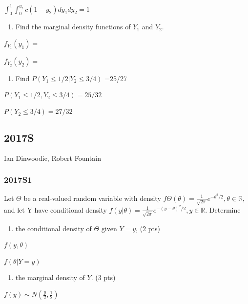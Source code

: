 \documentclass[6pt,twocolumn,Portrait]{article}
\providecommand{\tightlist}{%
  \setlength{\itemsep}{0pt}\setlength{\parskip}{0pt}}
\begin{document}
\(\int_0^1\int_0^{y_2}c(1-y_2)dy_1dy_2=1\)

\begin{enumerate}
\def\labelenumi{(\alph{enumi})}
\setcounter{enumi}{1}
\tightlist
\item
  Find the marginal density functions of \(Y_1\) and \(Y_2\).
\end{enumerate}

\(f_{Y_1}(y_1)=\)

\(f_{Y_2}(y_2)=\)

\begin{enumerate}
\def\labelenumi{(\alph{enumi})}
\setcounter{enumi}{2}
\tightlist
\item
  Find \(P(Y_1\le1/2|Y_2\le3/4)\) =25/27
\end{enumerate}

\(P(Y_1\le1/2, Y_2\le3/4)=25/32\)

\(P(Y_2\le3/4)=27/32\)

\hypertarget{s-10}{%
\subsection{2017S}\label{s-10}}

Ian Dinwoodie, Robert Fountain

\hypertarget{s1-5}{%
\subsubsection{2017S1}\label{s1-5}}

Let \(\Theta\) be a real-valued random variable with density
\(f\Theta(\theta) = \frac1{\sqrt{2\pi}}e^{-\theta^2/2},\theta\in\mathbb R\),
and let Y have conditional density
\(f(y|\theta) = \frac1{\sqrt{2\pi}}e^{-(y-\theta)^2/2},y\in\mathbb R\).
Determine

\begin{enumerate}
\def\labelenumi{(\alph{enumi})}
\tightlist
\item
  the conditional density of \(\Theta\) given \(Y = y\), (2 pts)
\end{enumerate}

\(f(y,\theta)\)

\(f(\theta|Y=y)\)

\begin{enumerate}
\def\labelenumi{(\alph{enumi})}
\setcounter{enumi}{1}
\tightlist
\item
  the marginal density of \(Y\). (3 pts)
\end{enumerate}

\(f(y)\sim N(\frac{y}2,\frac12)\)
\end{document}
